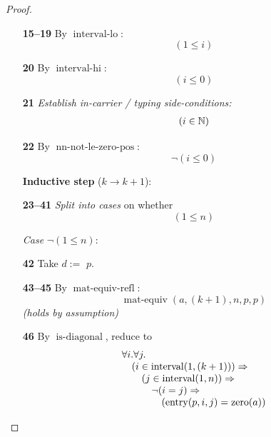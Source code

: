 \documentclass[11pt]{article}
\theoremstyle{plain}
\begin{document}
\begin{proof}
\begin{itemize}[leftmargin=2.8em, itemsep=4pt, parsep=1pt]
  \item[\textbf{15--19}] By $\operatorname{interval\text{-}lo}$:
\begin{equation*}
(1 \leq i)
\end{equation*}

  \item[\textbf{20}] By $\operatorname{interval\text{-}hi}$:
\begin{equation*}
(i \leq 0)
\end{equation*}

  \item[\textbf{21}] \emph{Establish in-carrier / typing side-conditions:}
\begin{equation*}
\begin{array}{@{}l@{}}
(i \in \mathbb{N})
\end{array}
\end{equation*}

  \item[\textbf{22}] By $\operatorname{nn\text{-}not\text{-}le\text{-}zero\text{-}pos}$:
\begin{equation*}
\neg (i \leq 0)
\end{equation*}

  \item[]\textbf{Inductive step} ($k \to k + 1$):
  \item[\textbf{23--41}] \emph{Split into cases} on whether
\begin{equation*}
(1 \leq n)
\end{equation*}

  \item[]\emph{Case} $\lnot (1 \leq n)$:
  \item[\textbf{42}] Take $d :=$ $p$.
  \item[\textbf{43--45}] By $\operatorname{mat\text{-}equiv\text{-}refl}$:
\begin{equation*}
\operatorname{mat\text{-}equiv}(a, (k + 1), n, p, p)
\end{equation*}
  \emph{(holds by assumption)}
  \item[\textbf{46}] By $\operatorname{is\text{-}diagonal}$, reduce to
\begin{equation*}
\begin{array}{@{}l@{}} \forall i. \forall j. \\ \quad (i \in \operatorname{interval}(1, (k + 1))) \Rightarrow  \\ \quad \quad (j \in \operatorname{interval}(1, n)) \Rightarrow  \\ \quad \quad \quad \neg (i = j) \Rightarrow  \\ \quad \quad \quad \quad (\operatorname{entry}(p, i, j) = \operatorname{zero}(a)) \end{array}
\end{equation*}


\end{itemize}
\end{proof}
\end{document}
